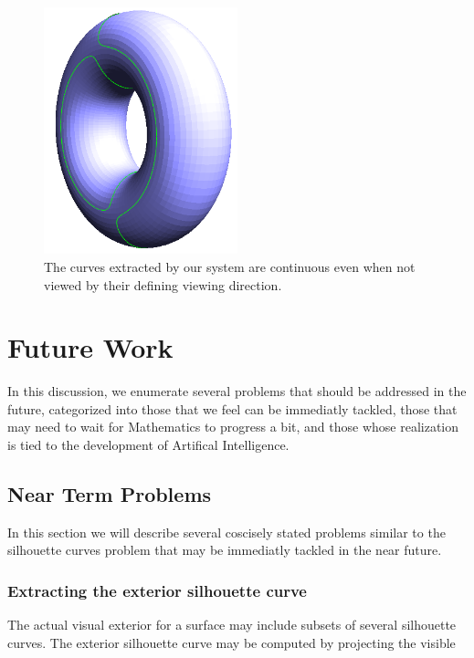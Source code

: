 \documentclass[12pt, letterpaper]{article}
\begin{document}
\begin{figure}[h]
\centering
\includegraphics[width=0.5\textwidth]{torus_silhouettes_side_view}
\caption{The curves extracted by our system are continuous even when not viewed by their defining viewing direction.}
\label{fig:torus_silhouette_side_view}
\end{figure}

\newpage

\section{Future Work}

In this discussion, we enumerate several problems that should be addressed in the future,
categorized into those that we feel can be immediatly tackled, those that may need to wait for Mathematics to progress a bit,
and those whose realization is tied to the development of Artifical Intelligence.

	\subsection{Near Term Problems}

	In this section we will describe several coscisely stated problems similar to the silhouette curves problem that may be immediatly tackled in the near future.

		\subsubsection{Extracting the exterior silhouette curve}
		The actual visual exterior for a surface may include subsets of several silhouette curves. The exterior silhouette curve may be computed by projecting the visible
\end{document}
